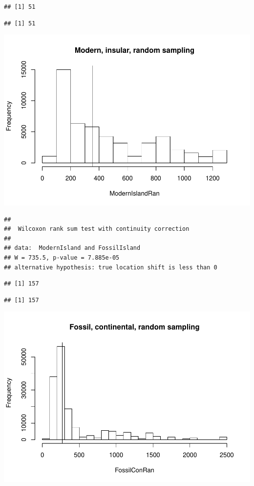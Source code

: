 \documentclass[]{article}
\begin{document}
\begin{verbatim}
## [1] 51
\end{verbatim}

\begin{verbatim}
## [1] 51
\end{verbatim}

\includegraphics{MA_JJ_files/figure-latex/RSMFCI-1.pdf}

\begin{verbatim}
## 
##  Wilcoxon rank sum test with continuity correction
## 
## data:  ModernIsland and FossilIsland
## W = 735.5, p-value = 7.885e-05
## alternative hypothesis: true location shift is less than 0
\end{verbatim}

\begin{verbatim}
## [1] 157
\end{verbatim}

\begin{verbatim}
## [1] 157
\end{verbatim}

\includegraphics{MA_JJ_files/figure-latex/RSMFCI-2.pdf}
\end{document}
